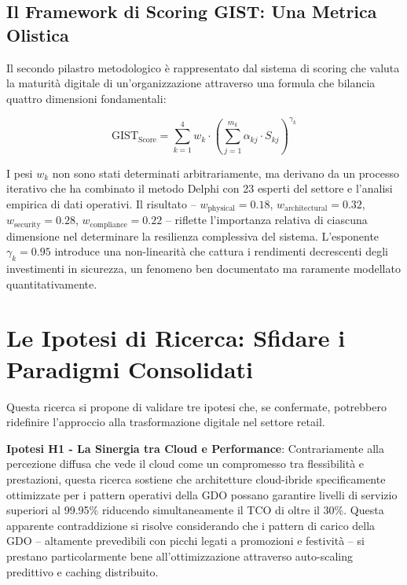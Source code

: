 \subsection{Il Framework di Scoring GIST: Una Metrica Olistica}

Il secondo pilastro metodologico è rappresentato dal sistema di scoring che valuta la maturità digitale di un'organizzazione attraverso una formula che bilancia quattro dimensioni fondamentali:

\begin{equation}
\text{GIST}_{\text{Score}} = \sum_{k=1}^{4} w_k \cdot \left(\sum_{j=1}^{m_k} \alpha_{kj} \cdot S_{kj}\right)^{\gamma_k}
\label{eq:gist_score}
\end{equation}

I pesi $w_k$ non sono stati determinati arbitrariamente, ma derivano da un processo iterativo che ha combinato il metodo Delphi con 23 esperti del settore e l'analisi empirica di dati operativi. Il risultato -- $w_{\text{physical}} = 0.18$, $w_{\text{architectural}} = 0.32$, $w_{\text{security}} = 0.28$, $w_{\text{compliance}} = 0.22$ -- riflette l'importanza relativa di ciascuna dimensione nel determinare la resilienza complessiva del sistema. L'esponente $\gamma_k = 0.95$ introduce una non-linearità che cattura i rendimenti decrescenti degli investimenti in sicurezza, un fenomeno ben documentato ma raramente modellato quantitativamente.

\section{Le Ipotesi di Ricerca: Sfidare i Paradigmi Consolidati}

Questa ricerca si propone di validare tre ipotesi che, se confermate, potrebbero ridefinire l'approccio alla trasformazione digitale nel settore retail.

\textbf{Ipotesi H1 - La Sinergia tra Cloud e Performance}: Contrariamente alla percezione diffusa che vede il cloud come un compromesso tra flessibilità e prestazioni, questa ricerca sostiene che architetture cloud-ibride specificamente ottimizzate per i pattern operativi della GDO possano garantire livelli di servizio superiori al 99.95\% riducendo simultaneamente il TCO di oltre il 30\%. Questa apparente contraddizione si risolve considerando che i pattern di carico della GDO -- altamente prevedibili con picchi legati a promozioni e festività -- si prestano particolarmente bene all'ottimizzazione attraverso auto-scaling predittivo e caching distribuito.

